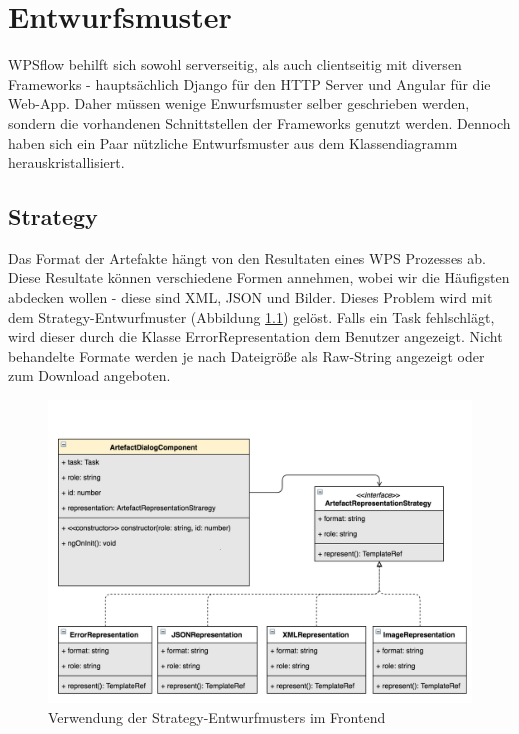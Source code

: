 \chapter{Entwurfsmuster}
    WPSflow behilft sich sowohl serverseitig, als auch clientseitig mit diversen Frameworks - hauptsächlich Django für den HTTP Server und Angular für die Web-App. Daher müssen wenige Enwurfsmuster selber geschrieben werden, sondern die vorhandenen Schnittstellen der Frameworks genutzt werden. Dennoch haben sich ein Paar nützliche Entwurfsmuster aus dem Klassendiagramm herauskristallisiert.

    \section{Strategy}
    Das Format der Artefakte hängt von den Resultaten eines WPS Prozesses ab. Diese Resultate können verschiedene Formen annehmen, wobei wir die Häufigsten abdecken wollen - diese sind XML, JSON und Bilder. 
    Dieses Problem wird mit dem Strategy-Entwurfmuster (Abbildung \ref{fig:pattern_strategy_diagramm}) gelöst.
    Falls ein Task fehlschlägt, wird dieser durch die Klasse ErrorRepresentation dem Benutzer angezeigt. Nicht behandelte Formate werden je nach Dateigröße als Raw-String angezeigt oder zum Download angeboten.
    
    \begin{figure}[h]
        \centering
        \includegraphics[width=15cm]{diagrams/pattern_strategy.png}
        \caption{Verwendung der Strategy-Entwurfmusters im Frontend}
        \label{fig:pattern_strategy_diagramm}
    \end{figure}
    
